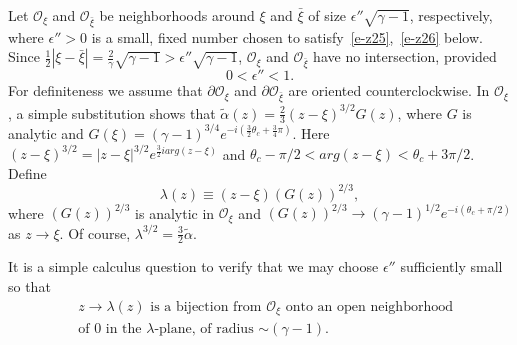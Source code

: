 \documentclass{amsart}
\theoremstyle{definition}
\theoremstyle{remark}
\numberwithin{equation}{section}
\newcommand{\wt}{\widetilde}
\begin{document}
Let $\mathcal{O}_{\xi}$ and ${\mathcal{O}}_{\bar{\xi}}$ be neighborhoods 
around $\xi$ and $\bar{\xi}$ of size 
$\epsilon''\sqrt{\gamma-1}$, respectively, where $\epsilon''>0$ is a small,  
fixed number chosen to satisfy~\eqref{e-z25},~\eqref{e-z26} below.
Since $\frac12 |\xi-\bar{\xi}|=\frac2{\gamma}\sqrt{\gamma-1} > 
\epsilon''\sqrt{\gamma-1}$, 
$\mathcal{O}_{\xi}$ and ${\mathcal{O}}_{\bar{\xi}}$ have no intersection, 
provided 
\begin{equation}\label{e-z25}
   0<\epsilon''<1.
\end{equation}
For definiteness we assume that $\partial\mathcal{O}_{\xi}$ and 
$\partial{\mathcal{O}}_{\bar{\xi}}$ are oriented counterclockwise.
In $\mathcal{O}_{\xi}$, a simple substitution shows that 
$\wt{\alpha}(z)=\frac23(z-\xi)^{3/2}G(z)$,
where $G$ is analytic and $G(\xi)=(\gamma-1)^{3/4}
e^{-i(\frac32\theta_c+\frac34\pi)}$.
Here $(z-\xi)^{3/2}=|z-\xi|^{3/2}e^{\frac32 i arg(z-\xi)}$ and
$\theta_c-\pi/2 < arg(z-\xi) <\theta_c+ 3\pi /2$.
Define
\begin{equation}
\lambda(z)\equiv (z-\xi)(G(z))^{2/3},
\end{equation}
where $(G(z))^{2/3}$ is analytic in $\mathcal{O}_{\xi}$ and 
$(G(z))^{2/3}\to (\gamma-1)^{1/2}e^{-i(\theta_c+\pi /2)}$ as $z\to\xi$.
Of course, $\lambda^{3/2}=\frac32 \wt{\alpha}$.
\begin{figure}[ht]
 \centerline{}
 \caption{}\label{fig-maptil}
\end{figure}
It is a simple calculus question to verify that we may choose $\epsilon''$ 
sufficiently small so that 
\begin{equation}\label{e-z26}
  \begin{split}
   &\text{$z\to\lambda(z)$ is a bijection from $\mathcal{O}_{\xi}$ 
onto an open neighborhood}\\
   &\text{of $0$ in the $\lambda$-plane, 
of radius $\sim (\gamma-1)$.}
  \end{split}
\end{equation}
\end{document}
